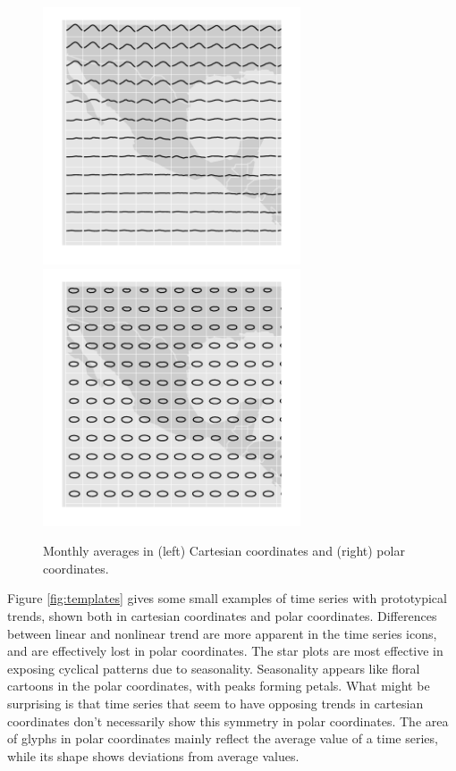 \documentclass[oneside]{article}
\begin{document}
\begin{figure}[htbp]
  \centering
  \includegraphics[width=3in]{month-cartesian}
  \includegraphics[width=3in]{month-polar}
    
  \caption{Monthly averages in (left) Cartesian coordinates and (right) polar coordinates.}
  
  \label{fig:cycle}
\end{figure}

Figure \ref{fig:templates} gives some small examples of time series with prototypical trends, shown both in cartesian coordinates and polar coordinates. Differences between linear and nonlinear trend are more apparent in the time series icons, and are effectively lost in polar coordinates. The star plots are most effective in exposing cyclical patterns due to seasonality. Seasonality appears like floral cartoons in the polar coordinates, with peaks forming petals. What might be surprising is that time series that seem to have opposing trends in cartesian coordinates don't necessarily show this symmetry in polar coordinates. The area of glyphs in polar coordinates mainly reflect the average value of a time series, while its shape shows deviations from average values. 
\end{document}
